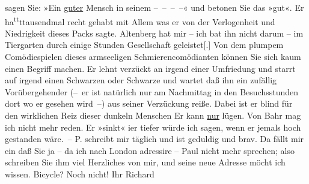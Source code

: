 \begin{ledgroupsized}[t]{13cm}
                sagen Sie: »Ein \uline{guter} Mensch in seinem – – – –« und betonen Sie
                    das »gut«. Er ha\substVorne{}\textsuperscript{tt}\substDazwischen{}t\substHinten{}{ }{\pb}tausendmal
                    recht gehabt mit Allem was er von der Verlogenheit und Niedrigkeit dieses Packs
                    sagte.\pend
           \pstart
           Altenberg hat mir – ich bat ihn nicht darum –
                        {\pb}im Tiergarten durch einige Stunden Gesellschaft geleistet{[}.{]}
                    Von dem plumpem Comödiespielen dieses armseeligen Schmierencomödianten können
                    Sie sich kaum einen Begriff machen. {\pb}Er lehnt verzückt an irgend
                    einer Umfriedung und starrt auf irgend einen Schwarzen oder Schwarze und wartet
                    daß ihn ein zufällig Vorübergehender (– er ist natürlich nur am Nachmittag
                    in den Besuchsstunden dort wo er gesehen wird –) {\pb}aus seiner Verzückung reiße.
                    Dabei ist er blind für den wirklichen Reiz dieser dunkeln Menschen\pend
           \pstart
           Er kann \uline{nur} lügen.\pend
           \pstart
           Von Bahr mag ich {\pb}nicht mehr reden. Er »sinkt«
                    i{\geminationm}er tiefer würde ich sagen, wenn er jemals hoch gestanden wäre. –\pend
           \pstart
           P.
                schreibt mir täglich und ist geduldig und
                    brav. Da fällt {\pb}mir ein daß
                    Sie ja – da ich nach London adressire – Paul nicht mehr sprechen; also schreiben Sie
                    ihm viel Herzliches von mir, und seine neue Adresse möcht ich wissen. Bicycle?
                    Noch nicht!\pend
           \pstart Ihr \spacefill\mbox{Richard}\pend{}\endnumbering{}\end{ledgroupsized}  \newcommand{\dateiname}{L00680}\newcommand{\titel}{Richard Beer-Hofmann an Arthur Schnitzler, 20. 5. 1897}\newcommand{\editorInnen}{ Martin Anton Müller und Gerd-Hermann Susen}
      